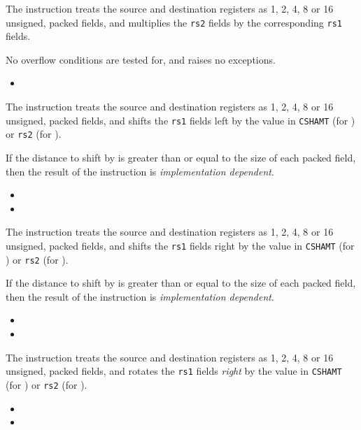 {\iencmulpx}
{
The instruction  treats the source and destination registers as
1, 2, 4, 8 or 16 unsigned, packed fields, and multiplies the {\tt rs2} fields
by the corresponding {\tt rs1} fields.

No overflow conditions are tested for, and  raises no exceptions.
}{
\begin{itemize}
\item {}
\end{itemize}
}{}


{\iencsllpx\iencsllipx}
{
The instruction  treats the source and destination registers as
1, 2, 4, 8 or 16 unsigned, packed fields, and shifts the {\tt rs1} fields
left by the value in {\tt CSHAMT} (for ) or {\tt rs2} 
(for ).

If the distance to shift by is greater than or equal to the size of each
packed field, then the result of the  instruction is
{\em implementation dependent}.
}{
\begin{itemize}
\item {}
\item {}
\end{itemize}
}{}


{\iencsrlpx\iencsrlipx}
{
The instruction  treats the source and destination registers as
1, 2, 4, 8 or 16 unsigned, packed fields, and shifts the {\tt rs1} fields
right by the value in {\tt CSHAMT} (for ) or {\tt rs2} 
(for ).

If the distance to shift by is greater than or equal to the size of each
packed field, then the result of the  instruction is
{\em implementation dependent}.
}{
\begin{itemize}
\item {}
\item {}
\end{itemize}
}{}


{\iencrotpx\iencrotipx}
{
The instruction  treats the source and destination registers as
1, 2, 4, 8 or 16 unsigned, packed fields, and rotates the {\tt rs1} fields
{\em right} by the value in {\tt CSHAMT} (for ) or {\tt rs2} 
(for ).
}{
\begin{itemize}
\item {}
\item {}
\end{itemize}
}{}

